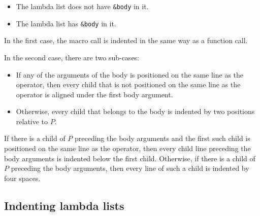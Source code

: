 \begin{itemize}
\item The lambda list does not have \texttt{\&body} in it.
\item The lambda list has \texttt{\&body} in it.
\end{itemize}

In the first case, the macro call is indented in the same way as a
function call.

In the second case, there are two sub-cases:

\begin{itemize}
\item If any of the arguments of the body is positioned on the same
  line as the operator, then every child that is not positioned on the
  same line as the operator is aligned under the first body argument.
\item Otherwise, every child that belongs to the body is indented by
  two positions relative to $P$.
\end{itemize}

If there is a child of $P$ preceding the body arguments and the first
such child is positioned on the same line as the operator, then every
child line preceding the body arguments is indented below the first
child.  Otherwise, if there is a child of $P$ preceding the body
arguments, then every line of such a child is indented by four spaces.

\subsection{Indenting lambda lists}
